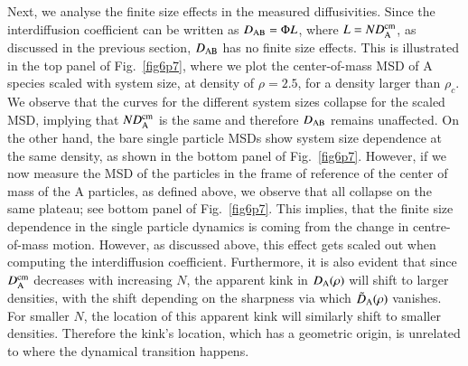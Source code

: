 Next, we analyse the finite size effects in the measured diffusivities. Since the interdiffusion coefficient can be written as $D_{\rm AB} = \Phi L$, where $L = N D_{\rm A}^{\rm cm}$, as discussed in the previous section, $D_{\rm AB}$ has no finite size effects. This is illustrated in the top panel of Fig.~\ref{fig6p7}, where we plot the center-of-mass MSD of A species scaled with system size, at density of $\rho=2.5$, for a density larger than $\rho_c$. We observe that the curves for the different system sizes collapse for the scaled MSD, implying that ${N}D_{\rm A}^{\rm cm}$ is the same and therefore $D_{\rm AB}$ remains unaffected. On the other hand, the bare single particle MSDs show system size dependence at the same density, as shown in the bottom panel of Fig.~\ref{fig6p7}. However, if we now measure the MSD of the particles in the frame of reference of the center of mass of the A particles, as defined above, we observe that all collapse on the same plateau; see bottom panel of Fig.~\ref{fig6p7}.  This implies, that the finite size dependence in the single particle dynamics is coming from the change in centre-of-mass motion. However, as discussed above, this effect gets scaled out when computing the interdiffusion coefficient. {Furthermore, it is also evident that since $D_{\rm A}^{\rm cm}$ decreases with increasing $N$, the apparent kink in $D_{\rm A}(\rho)$ will shift to larger densities, with the shift depending on the sharpness via which $\tilde{D}_{\rm A}(\rho)$ vanishes.} For smaller $N$, the location of this apparent kink will similarly shift to smaller densities. Therefore the kink's location, which has a geometric origin, is  unrelated to where the dynamical transition happens.


